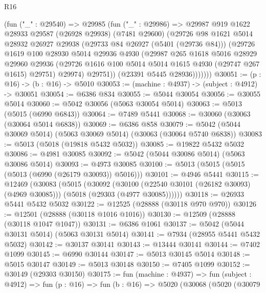\begin{lexlean}{R16}
\begin{coremodule}
            (fun ("_" : @29540) =>
            @29985
              (fun ("_" : @29986) =>
              @29987
                @919
                @1622
                @28933
                @29587
                (@26928 @29938)
                (@7481 @29600)
                (@29726
                  @98
                  @1621
                  @5014
                  @28932
                  @26927
                  @29938
                  (@29733 @84 @26927 (@5401 (@29736 @84)))
                  (@29726
                    @1619
                    @100
                    @28930
                    @5014
                    @29936
                    @4930
                    (@29987
                      @265
                      @1618
                      @5016
                      @28929
                      @29960
                      @29936
                      (@29726 @1616 @100 @5014 @5014 @1615 @4930 (@29747 @267 @1615) @29751)
                      @29974)
                    @29751))
                (@23391 @5445 @28936)))))))
@30051 := (p : @16) -> (b : @16) -> @5010
@30053 := (machine : @4937) -> (subject : @4912) -> @30051
@30054 := @6386 @834
@30055 := @5044 @30054
@30056 := @30055 @5014
@30060 := @5042 @30056 (@5063 @30054 @5014)
@30063 := @5013 (@5015 (@6990 @6843))
@30064 := @7489 @5441
@30068 := @30060 (@30063 (@30064 @5014 @6838))
@30069 := @6386 @858
@30079 := @5042 (@5044 @30069 @5014) (@5063 @30069 @5014) (@30063 (@30064 @5740 @6838))
@30083 := @5013 (@5018 (@19818 @5432 @5032))
@30085 := @19822 @5432 @5032
@30086 := @4981 @30085
@30092 := @5042 (@5044 @30086 @5014) (@5063 @30086 @5014)
@30093 := @4973 @30085
@30100 := @5013 (@5015 (@5015 (@5013 (@6990 (@26179 @30093)) @5016)))
@30101 := @4946 @5441
@30115 := @12469
    (@30083
      (@5015
        (@30092
          (@30100 (@22540 @30101 (@26182 @30093) (@4969 @30085)))
          (@5018 (@29303 (@4977 @30085))))))
@30118 := @26933 @5441 @5432 @5032
@30122 := @12525 (@28888 (@30118 @970 @970))
@30126 := @12501 (@28888 (@30118 @1016 @1016))
@30130 := @12509 (@28888 (@30118 @1047 @1047))
@30131 := @6386 @1061
@30137 := @5042 (@5044 @30131 @5014) (@5063 @30131 @5014)
@30141 := @7934 (@28955 @5441 @5432 @5032)
@30142 := @30137 @30141
@30143 := @13444 @30141
@30144 := @7402 @1099
@30145 := @6990 @30144
@30147 := @5013 @30145 @5014
@30148 := @5015 @30147
@30149 := @5013 @30148
@30150 := @7405 @1099
@30152 := @30149 (@29303 @30150)
@30175 := fun (machine : @4937) =>
  fun (subject : @4912) =>
  fun (p : @16) =>
  fun (b : @16) =>
  @5020
    (@30068
      (@5020
        (@30079

\end{coremodule}
\end{lexlean}
